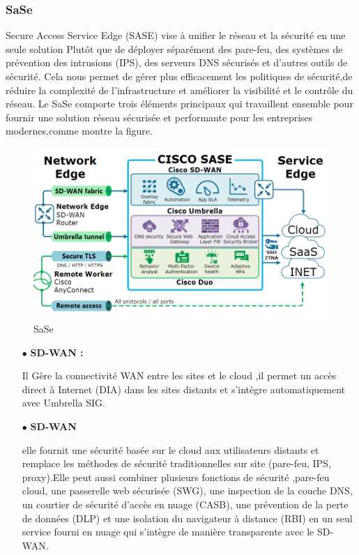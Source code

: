 \subsubsection{SaSe }
Secure Access Service Edge (SASE) vise à unifier le réseau et la sécurité en une seule solution
Plutôt que de déployer séparément des pare-feu, des systèmes de prévention des intrusions (IPS), des serveurs DNS sécurisés et d'autres outils de sécurité. Cela nous permet de gérer  plus efficacement les politiques de sécurité,de réduire la complexité de l'infrastructure et améliorer la visibilité et le contrôle du réseau.
Le SaSe comporte trois éléments principaux qui travaillent ensemble pour fournir une solution réseau sécurisée et performante pour les entreprises modernes,comme montre la figure. 
\begin{figure} [H]
	\begin{center}
		\centering
		\hspace*{-0.5cm}
     \includegraphics{../image/sas}
	\end{center}
	\caption{SaSe}
\end{figure} 
\begin{itemize}
	\item[$\bullet$]\textbf{  SD-WAN :} 
	
	Il Gère la connectivité WAN entre les sites et le cloud ,il permet un accès direct à Internet (DIA) dans les sites distants et s'intègre automatiquement avec Umbrella SIG.
\end{itemize}
\begin{itemize}
	\item[$\bullet$]\textbf{  SD-WAN } 
	
	elle fournit une sécurité basée sur le cloud aux utilisateurs distants et remplace les méthodes de sécurité traditionnelles sur site (pare-feu, IPS, proxy).Elle peut aussi combiner plusieurs fonctions de sécurité ,pare-feu cloud, une passerelle web sécurisée (SWG), une inspection de la couche DNS, un courtier de sécurité d'accès en nuage (CASB), une prévention de la perte de données (DLP) et une isolation du navigateur à distance (RBI) en un seul service fourni en nuage qui s'intègre de manière transparente avec le SD-WAN.
\end{itemize}
